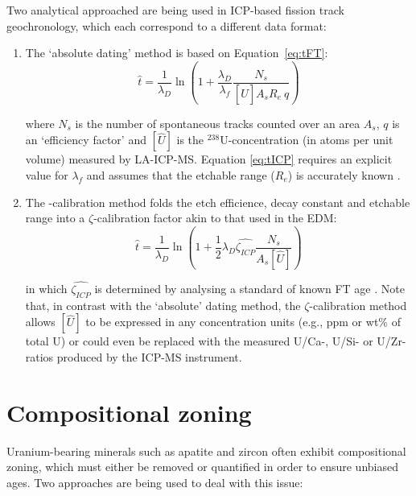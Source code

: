 \begin{refsection}
Two analytical approached are being used in ICP-based fission track
geochronology, which each correspond to a different data format:

\begin{enumerate}
\item The `absolute dating' method is based on
  Equation~\ref{eq:tFT}:
  \begin{equation}
    \hat{t} = \frac{1}{\lambda_D}
    \ln \left(1 + \frac{\lambda_D}{\lambda_f}\frac{N_s}{[\hat{U}] A_s R_e ~ q}\right)
    \label{eq:tICP}
  \end{equation}

  where $N_s$ is the number of spontaneous tracks counted over an area
  $A_s$, $q$ is an `efficiency factor' \citep[$\sim$0.93 for apatite and
    $\sim$1 for
    zircon,][]{iwano1998,enkelmann2003,jonckheere2003b,soares2013} and
  $[\hat{U}]$ is the $^{238}$U-concentration (in atoms per unit volume)
  measured by LA-ICP-MS. Equation \ref{eq:tICP} requires an explicit
  value for $\lambda_f$ and assumes that the etchable range ($R_e$) is
  accurately known \citep{soares2014}.

\item The \textzeta-calibration method folds the etch efficience,
  decay constant and etchable range into a $\zeta$-calibration factor
  akin to that used in the EDM:
  \begin{equation}
    \hat{t} = \frac{1}{\lambda_D}
    \ln \left(1+\frac{1}{2}\lambda_D\hat{\zeta_{ICP}}\frac{N_s}{A_s[\hat{U}]}\right)
    \label{eq:tzetahatICP}
  \end{equation}

  in which $\hat{\zeta_{ICP}}$ is determined by analysing a standard of
  known FT age \citep{hasebe2004}. Note that, in contrast with the
  `absolute' dating method, the $\zeta$-calibration method allows
  $[\hat{U}]$ to be expressed in any concentration units (e.g., ppm or
  wt\% of total U) or could even be replaced with the measured U/Ca-,
  U/Si- or U/Zr-ratios produced by the ICP-MS instrument.
\end{enumerate}

\section{Compositional zoning}\label{sec:zoning}

Uranium-bearing minerals such as apatite and zircon often exhibit
compositional zoning, which must either be removed or quantified in
order to ensure unbiased ages. Two approaches are being used to deal
with this issue:


\end{refsection}

